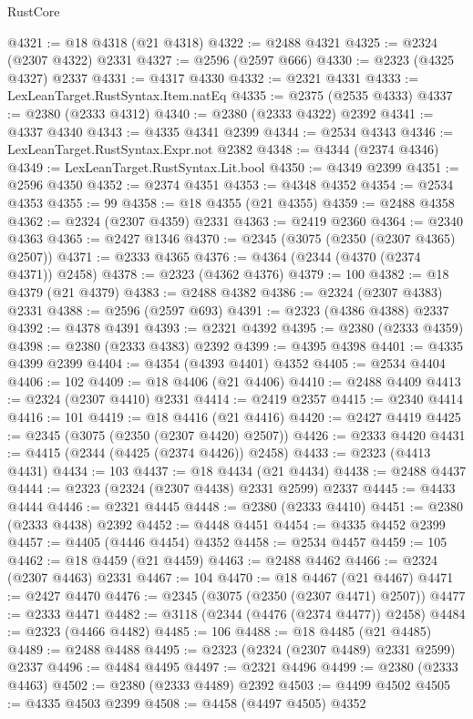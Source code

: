 \begin{lexlean}{RustCore}
\begin{coremodule}
@4321 := @18 @4318 (@21 @4318)
@4322 := @2488 @4321
@4325 := @2324 (@2307 @4322) @2331
@4327 := @2596 (@2597 @666)
@4330 := @2323 (@4325 @4327) @2337
@4331 := @4317 @4330
@4332 := @2321 @4331
@4333 := LexLeanTarget.RustSyntax.Item.natEq
@4335 := @2375 (@2535 @4333)
@4337 := @2380 (@2333 @4312)
@4340 := @2380 (@2333 @4322) @2392
@4341 := @4337 @4340
@4343 := @4335 @4341 @2399
@4344 := @2534 @4343
@4346 := LexLeanTarget.RustSyntax.Expr.not @2382
@4348 := @4344 (@2374 @4346)
@4349 := LexLeanTarget.RustSyntax.Lit.bool
@4350 := @4349 @2399
@4351 := @2596 @4350
@4352 := @2374 @4351
@4353 := @4348 @4352
@4354 := @2534 @4353
@4355 := 99
@4358 := @18 @4355 (@21 @4355)
@4359 := @2488 @4358
@4362 := @2324 (@2307 @4359) @2331
@4363 := @2419 @2360
@4364 := @2340 @4363
@4365 := @2427 @1346
@4370 := @2345 (@3075 (@2350 (@2307 @4365) @2507))
@4371 := @2333 @4365
@4376 := @4364 (@2344 (@4370 (@2374 @4371)) @2458)
@4378 := @2323 (@4362 @4376)
@4379 := 100
@4382 := @18 @4379 (@21 @4379)
@4383 := @2488 @4382
@4386 := @2324 (@2307 @4383) @2331
@4388 := @2596 (@2597 @693)
@4391 := @2323 (@4386 @4388) @2337
@4392 := @4378 @4391
@4393 := @2321 @4392
@4395 := @2380 (@2333 @4359)
@4398 := @2380 (@2333 @4383) @2392
@4399 := @4395 @4398
@4401 := @4335 @4399 @2399
@4404 := @4354 (@4393 @4401) @4352
@4405 := @2534 @4404
@4406 := 102
@4409 := @18 @4406 (@21 @4406)
@4410 := @2488 @4409
@4413 := @2324 (@2307 @4410) @2331
@4414 := @2419 @2357
@4415 := @2340 @4414
@4416 := 101
@4419 := @18 @4416 (@21 @4416)
@4420 := @2427 @4419
@4425 := @2345 (@3075 (@2350 (@2307 @4420) @2507))
@4426 := @2333 @4420
@4431 := @4415 (@2344 (@4425 (@2374 @4426)) @2458)
@4433 := @2323 (@4413 @4431)
@4434 := 103
@4437 := @18 @4434 (@21 @4434)
@4438 := @2488 @4437
@4444 := @2323 (@2324 (@2307 @4438) @2331 @2599) @2337
@4445 := @4433 @4444
@4446 := @2321 @4445
@4448 := @2380 (@2333 @4410)
@4451 := @2380 (@2333 @4438) @2392
@4452 := @4448 @4451
@4454 := @4335 @4452 @2399
@4457 := @4405 (@4446 @4454) @4352
@4458 := @2534 @4457
@4459 := 105
@4462 := @18 @4459 (@21 @4459)
@4463 := @2488 @4462
@4466 := @2324 (@2307 @4463) @2331
@4467 := 104
@4470 := @18 @4467 (@21 @4467)
@4471 := @2427 @4470
@4476 := @2345 (@3075 (@2350 (@2307 @4471) @2507))
@4477 := @2333 @4471
@4482 := @3118 (@2344 (@4476 (@2374 @4477)) @2458)
@4484 := @2323 (@4466 @4482)
@4485 := 106
@4488 := @18 @4485 (@21 @4485)
@4489 := @2488 @4488
@4495 := @2323 (@2324 (@2307 @4489) @2331 @2599) @2337
@4496 := @4484 @4495
@4497 := @2321 @4496
@4499 := @2380 (@2333 @4463)
@4502 := @2380 (@2333 @4489) @2392
@4503 := @4499 @4502
@4505 := @4335 @4503 @2399
@4508 := @4458 (@4497 @4505) @4352

\end{coremodule}
\end{lexlean}
